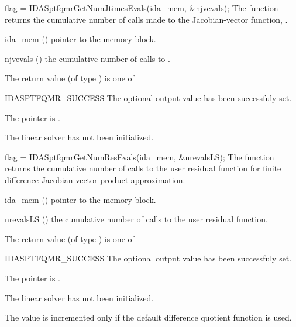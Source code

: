 {{}
{}
{
  flag = IDASptfqmrGetNumJtimesEvals(ida\_mem, \&njvevals);
}
{
  The function  returns the
  cumulative number of calls made to the Jacobian-vector function,
  .
}
{
  \begin{args}[njvevals]
  \item[ida\_mem] ()
    pointer to the {\ida} memory block.
  \item[njvevals] ()
    the cumulative number of calls to .
  \end{args}
}
{
  The return value  (of type ) is one of
  \begin{args}
  \item[IDASPTFQMR\_SUCCESS] 
    The optional output value has been successfuly set.
  \item[\Id{IDASPTFQMR\_MEM\_NULL}]
    The  pointer is .
  \item[\Id{IDASPTFQMR\_LMEM\_NULL}]
    The {\idasptfqmr} linear solver has not been initialized.
  \end{args}
}
{}
{
  flag = IDASptfqmrGetNumResEvals(ida\_mem, \&nrevalsLS);
}
{
  The function  returns the
  cumulative number of calls to the user residual function for
  finite difference Jacobian-vector product approximation.
}
{
  \begin{args}[nrevalsLS]
  \item[ida\_mem] ()
    pointer to the {\ida} memory block.
  \item[nrevalsLS] ()
    the cumulative number of calls to the user residual function.
  \end{args}
}
{
  The return value  (of type ) is one of
  \begin{args}
  \item[IDASPTFQMR\_SUCCESS] 
    The optional output value has been successfuly set.
  \item[\Id{IDASPTFQMR\_MEM\_NULL}]
    The  pointer is .
  \item[\Id{IDASPTFQMR\_LMEM\_NULL}]
    The {\idasptfqmr} linear solver has not been initialized.
  \end{args}
}
{
  The value  is incremented only if the default 
   difference quotient function is used.
}
}
